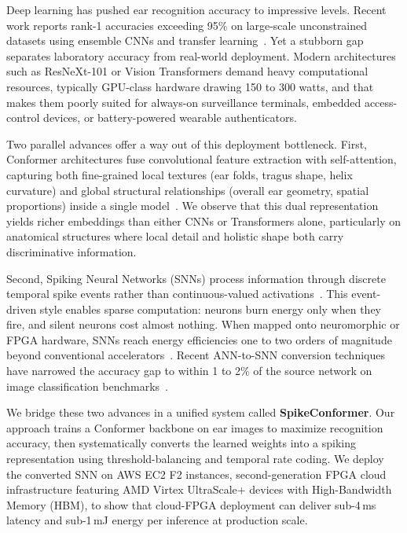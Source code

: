 \documentclass[11pt,a4paper]{article}
\begin{document}
Deep learning has pushed ear recognition accuracy to impressive levels. Recent work reports rank-1 accuracies exceeding 95\% on large-scale unconstrained datasets using ensemble CNNs and transfer learning~\cite{alshazly2020deep, mohamed2024advancing}. Yet a stubborn gap separates laboratory accuracy from real-world deployment. Modern architectures such as ResNeXt-101 or Vision Transformers demand heavy computational resources, typically GPU-class hardware drawing 150 to 300 watts, and that makes them poorly suited for always-on surveillance terminals, embedded access-control devices, or battery-powered wearable authenticators.

Two parallel advances offer a way out of this deployment bottleneck. First, Conformer architectures fuse convolutional feature extraction with self-attention, capturing both fine-grained local textures (ear folds, tragus shape, helix curvature) and global structural relationships (overall ear geometry, spatial proportions) inside a single model~\cite{peng2021conformer, gulati2020conformer}. We observe that this dual representation yields richer embeddings than either CNNs or Transformers alone, particularly on anatomical structures where local detail and holistic shape both carry discriminative information.

Second, Spiking Neural Networks (SNNs) process information through discrete temporal spike events rather than continuous-valued activations~\cite{maass1997networks, tavanaei2019deep}. This event-driven style enables sparse computation: neurons burn energy only when they fire, and silent neurons cost almost nothing. When mapped onto neuromorphic or FPGA hardware, SNNs reach energy efficiencies one to two orders of magnitude beyond conventional accelerators~\cite{davies2018loihi, akopyan2015truenorth}. Recent ANN-to-SNN conversion techniques have narrowed the accuracy gap to within 1 to 2\% of the source network on image classification benchmarks~\cite{rueckauer2017conversion, li2021free}.

We bridge these two advances in a unified system called \textbf{SpikeConformer}. Our approach trains a Conformer backbone on ear images to maximize recognition accuracy, then systematically converts the learned weights into a spiking representation using threshold-balancing and temporal rate coding. We deploy the converted SNN on AWS EC2 F2 instances, second-generation FPGA cloud infrastructure featuring AMD Virtex UltraScale+ devices with High-Bandwidth Memory (HBM), to show that cloud-FPGA deployment can deliver sub-4\,ms latency and sub-1\,mJ energy per inference at production scale.
\end{document}
